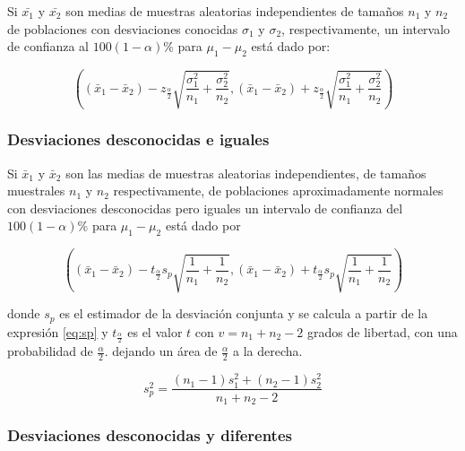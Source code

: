 \documentclass[]{book}
\begin{document}
Si \(\bar{x_1}\) y \(\bar{x_2}\) son medias de muestras aleatorias independientes de tamaños \(n_1\) y \(n_2\) de poblaciones con desviaciones conocidas \(\sigma_1\) y \(\sigma_2\), respectivamente, un intervalo de confianza al \(100\left(1-\alpha\right)\%\) para \(\mu_1-\mu_2\) está dado por:

\begin{equation} 
\left( \left( \bar{x}_1 - \bar{x}_2 \right) - z_{\frac{\alpha}{2}}\sqrt{\dfrac{\sigma_1^2}{n_1} + \dfrac{\sigma_2^2}{n_2}} , \left( \bar{x}_1 - \bar{x}_2 \right) + z_{\frac{\alpha}{2}}\sqrt{\dfrac{\sigma_1^2}{n_1} + \dfrac{\sigma_2^2}{n_2}} \right) 
\label{eq:ic2msc}
\end{equation}

\hypertarget{desviaciones-desconocidas-e-iguales}{%
\subsubsection{Desviaciones desconocidas e iguales}\label{desviaciones-desconocidas-e-iguales}}

Si \(\bar{x}_1\) y \(\bar{x}_2\) son las medias de muestras aleatorias independientes, de tamaños muestrales \(n_1\) y \(n_2\) respectivamente, de poblaciones aproximadamente normales con desviaciones desconocidas pero iguales un intervalo de confianza del \(100\left(1-\alpha \right)\%\) para \(\mu_1 - \mu_2\) está dado por

\begin{equation} 
\left( \left( \bar{x}_1 - \bar{x}_2 \right) - t_{\frac{\alpha}{2}}s_p\sqrt{\dfrac{1}{n_1} + \dfrac{1}{n_2}} , \left( \bar{x}_1 - \bar{x}_2 \right) + t_{\frac{\alpha}{2}}s_p\sqrt{\dfrac{1}{n_1} + \dfrac{1}{n_2}} \right) 
\label{eq:ic2msd}
\end{equation}

donde \(s_p\) es el estimador de la desviación conjunta y se calcula a partir de la expresión \eqref{eq:sp} y \(t_{\frac{\alpha}{2}}\) es el valor \(t\) con \(v=n_1+n_2-2\) grados de libertad, con una probabilidad de \(\frac{\alpha}{2}\). dejando un área de \(\frac{\alpha}{2}\) a la derecha.

\begin{equation} 
s_p^2 = \dfrac{\left(n_1 - 1 \right)s_1^2+\left(n_2 - 1 \right)s_2^2}{n_1 +n_2 -2} 
\label{eq:sp}
\end{equation}

\hypertarget{desviaciones-desconocidas-y-diferentes}{%
\subsubsection{Desviaciones desconocidas y diferentes}\label{desviaciones-desconocidas-y-diferentes}}
\end{document}
